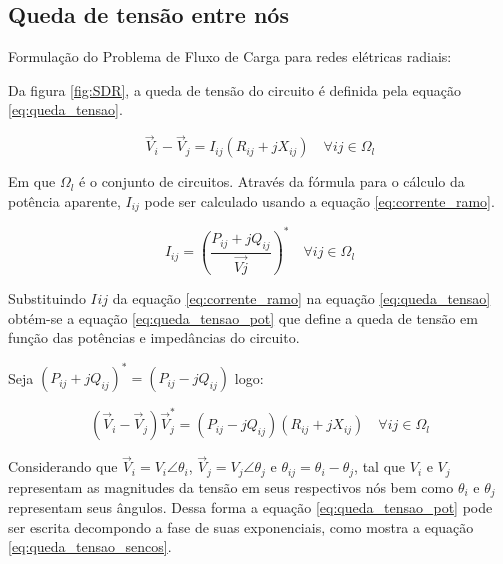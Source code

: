 \subsection{Queda de tensão entre nós}


Formulação do Problema de Fluxo de Carga para redes elétricas radiais:

Da figura \ref{fig:SDR}, a queda de tensão do circuito é definida pela equação \ref{eq:queda_tensao}.

\begin{equation}
    \Vec{V}_{i} - \Vec{V}_{j} = I_{ij}(R_{ij} + jX_{ij})\quad\forall ij \in \Omega_{l}
    \label{eq:queda_tensao}
\end{equation}

Em que $\Omega_{l}$ é o conjunto de circuitos. %
Através da fórmula para o cálculo da potência aparente, $I_{ij}$ pode ser calculado usando a equação \ref{eq:corrente_ramo}.

\begin{equation}
    I_{ij} = \left(\frac{P_{ij} + jQ_{ij}}{\Vec{Vj}}\right)^{*}\quad\forall ij \in \Omega_{l}
    \label{eq:corrente_ramo}
\end{equation}


Substituindo $I_{}ij$ da equação \ref{eq:corrente_ramo} na equação \ref{eq:queda_tensao} obtém-se a equação \ref{eq:queda_tensao_pot} que define a queda de tensão em função das potências e impedâncias do circuito.

Seja $(P_{ij} + jQ_{ij})^{*} = (P_{ij} - jQ_{ij})$ logo:

\begin{equation}
    (\Vec{V}_{i} - \Vec{V}_{j})\Vec{V}_{j}^{*} = (P_{ij} - jQ_{ij})(R_{ij} + jX_{ij}) \quad\forall ij \in \Omega_{l}
    \label{eq:queda_tensao_pot}
\end{equation}

Considerando que $\Vec{V}_{i} = V_{i}\angle{\theta_{i}}$, $\Vec{V}_{j} = V_{j}\angle{\theta_{j}}$ e $\theta_{ij} = \theta_{i} - \theta_{j}$, tal que  $V_{i}$ e $V_{j}$ representam as magnitudes da tensão em seus respectivos nós bem como $\theta_{i}$ e $\theta_{j}$ representam seus ângulos.
Dessa forma a equação \ref{eq:queda_tensao_pot} pode ser escrita decompondo a fase de suas exponenciais, como mostra a equação \ref{eq:queda_tensao_sencos}.

